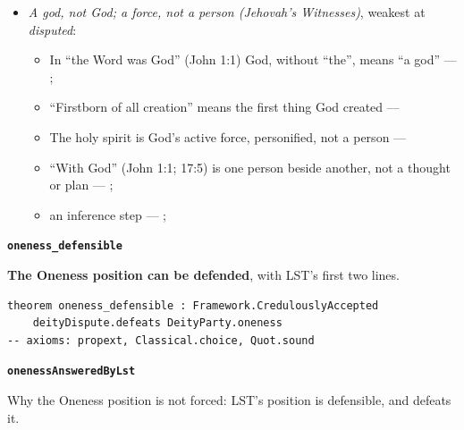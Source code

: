 \documentclass[11pt,paper=\testimonypaper,DIV=13,parskip=false]{scrartcl}
\begin{document}
\begin{itemize}
\begin{itemize}
\item In Matthew 28:19 three are named, and the one name is theirs together --- \cite[3, The Triune God]{kibbey-living-systematic-theology-2026}
\end{itemize}
\item \emph{A god, not God; a force, not a person (Jehovah’s Witnesses)}, weakest at \emph{disputed}:
\begin{itemize}
\item In “the Word was God” (John 1:1) God, without “the”, means “a god” --- \cite[27]{watchtower-should-you-believe-trinity-1989}; \cite{new-world-translation-2013}
\item “Firstborn of all creation” means the first thing God created --- \cite[14]{watchtower-should-you-believe-trinity-1989}
\item The holy spirit is God’s active force, personified, not a person --- \cite[20--23]{watchtower-should-you-believe-trinity-1989}
\item “With God” (John 1:1; 17:5) is one person beside another, not a thought or plan --- \cite[3, The Triune God]{kibbey-living-systematic-theology-2026}; \cite[27]{watchtower-should-you-believe-trinity-1989}
\item an inference step --- \cite[23]{watchtower-should-you-believe-trinity-1989}; \cite[122--123]{roberts-christendom-astray}
\end{itemize}
\end{itemize}
\par\medskip\noindent\textbf{\texttt{oneness\_\allowbreak{}defensible}}\par\nobreak\noindent
\textbf{The Oneness position can be defended}, with LST’s first two lines.

{\small\begin{verbatim}
theorem oneness_defensible : Framework.CredulouslyAccepted
    deityDispute.defeats DeityParty.oneness
-- axioms: propext, Classical.choice, Quot.sound
\end{verbatim}}
\par\medskip\noindent\textbf{\texttt{oneness\allowbreak{}Answered\allowbreak{}By\allowbreak{}Lst}}\par\nobreak\noindent
Why the Oneness position is not forced: LST’s position is defensible, and defeats it.
\end{document}
